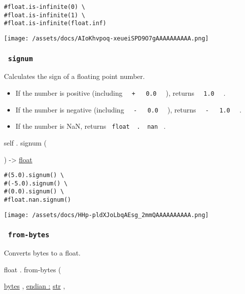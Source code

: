 \begin{verbatim}
#float.is-infinite(0) \
#float.is-infinite(1) \
#float.is-infinite(float.inf)
\end{verbatim}

\texttt{[image: /assets/docs/AIoKhvpoq-xeueiSPD9O7gAAAAAAAAAA.png]}

\subsubsection{\texorpdfstring{\texttt{\ signum\ }}{ signum }}\label{definitions-signum}

Calculates the sign of a floating point number.

\begin{itemize}
\tightlist
\item
  If the number is positive (including
  \texttt{\ }{\texttt{\ +\ }}\texttt{\ }{\texttt{\ 0.0\ }}\texttt{\ } ),
  returns \texttt{\ }{\texttt{\ 1.0\ }}\texttt{\ } .
\item
  If the number is negative (including
  \texttt{\ }{\texttt{\ -\ }}\texttt{\ }{\texttt{\ 0.0\ }}\texttt{\ } ),
  returns
  \texttt{\ }{\texttt{\ -\ }}\texttt{\ }{\texttt{\ 1.0\ }}\texttt{\ } .
\item
  If the number is NaN, returns
  \texttt{\ float\ }{\texttt{\ .\ }}\texttt{\ nan\ } .
\end{itemize}

self { . } { signum } (

) -\textgreater{} \href{/docs/reference/foundations/float/}{float}

\begin{verbatim}
#(5.0).signum() \
#(-5.0).signum() \
#(0.0).signum() \
#float.nan.signum()
\end{verbatim}

\texttt{[image: /assets/docs/HHp-pldXJoLbqAEsg\_2mmQAAAAAAAAAA.png]}

\subsubsection{\texorpdfstring{\texttt{\ from-bytes\ }}{ from-bytes }}\label{definitions-from-bytes}

Converts bytes to a float.

float { . } { from-bytes } (

{ \href{/docs/reference/foundations/bytes/}{bytes} , } {
\hyperref[definitions-from-bytes-parameters-endian]{endian :}
\href{/docs/reference/foundations/str/}{str} , }

